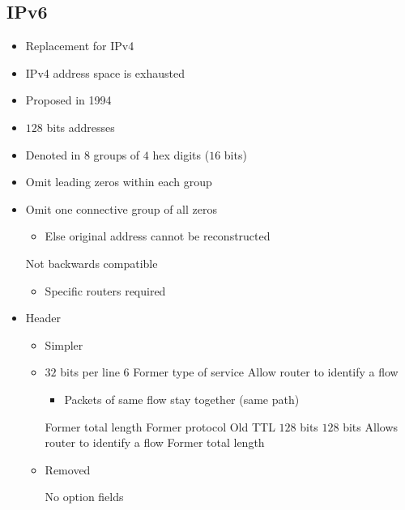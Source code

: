 \subsection{IPv6}
\begin{itemize}
    \item Replacement for IPv4
    \item IPv4 address space is exhausted
    \item Proposed in 1994
    \item $128$ bits addresses
    \item Denoted in $8$ groups of $4$ hex digits ($16$ bits)
    \item Omit leading zeros within each group
    \item Omit one connective group of all zeros
        \begin{itemize}
            \item Else original address cannot be reconstructed
        \end{itemize}
    \icon Not backwards compatible
        \begin{itemize}
            \item Specific routers required
        \end{itemize}
    \item Header
        \begin{itemize}
            \item Simpler
            \item $32$ bits per line
                 6
                 Former type of service
                 Allow router to identify a flow
                \begin{itemize}
                    \item Packets of same flow stay together (same path)
                \end{itemize}
                 Former total length
                 Former protocol
                 Old TTL
                 $128$ bits
                 $128$ bits
             Allows router to identify a flow
             Former total length
            \item Removed
                \begin{itemize}
                        \begin{itemize}
                             No option fields

\end{itemize}
\end{itemize}
\end{itemize}
\end{itemize}

